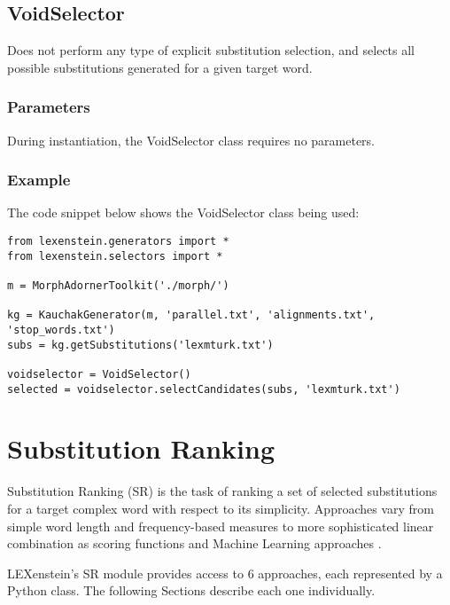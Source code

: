 \subsection{VoidSelector}

Does not perform any type of explicit substitution selection, and selects all possible substitutions generated for a given target word.

\subsubsection{Parameters}

During instantiation, the VoidSelector class requires no parameters.

\subsubsection{Example}

The code snippet below shows the VoidSelector class being used:

\begin{lstlisting}
from lexenstein.generators import *
from lexenstein.selectors import *

m = MorphAdornerToolkit('./morph/')

kg = KauchakGenerator(m, 'parallel.txt', 'alignments.txt', 'stop_words.txt')
subs = kg.getSubstitutions('lexmturk.txt')

voidselector = VoidSelector()
selected = voidselector.selectCandidates(subs, 'lexmturk.txt')
\end{lstlisting}








\section{Substitution Ranking}
\label{rankers}

Substitution Ranking (SR) is the task of ranking a set of selected substitutions for a target complex word with respect to its simplicity. Approaches vary from simple word length and frequency-based measures \cite{Devlin1998,Carroll98,Carroll99,Biran2011} to more sophisticated linear combination as scoring functions \cite{uowshef} and Machine Learning approaches \cite{Horn2014}.

LEXenstein's SR module provides access to $6$ approaches, each represented by a Python class. The following Sections describe each one individually.

